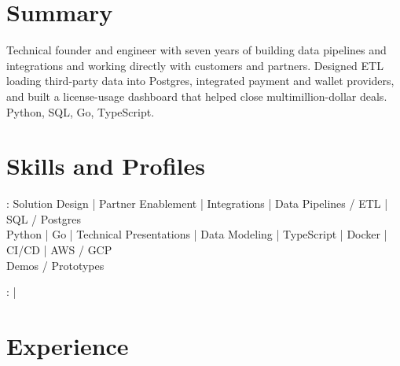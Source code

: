 \documentclass[print]{jack-resume}
\begin{document}
\pagecolor{darkmodeBackground}


\begin{minipage}[t][1cm][t]{.03\textwidth}
    \hfill
\end{minipage}

\section{Summary}
Technical founder and engineer with seven years of building data pipelines and integrations and working directly with customers and partners. Designed ETL loading third-party data into Postgres, integrated payment and wallet providers, and built a license-usage dashboard that helped close multimillion-dollar deals. Python, SQL, Go, TypeScript.
\sectionsep

\section{Skills and Profiles}
:
Solution Design \hfill | \hfill
Partner Enablement \hfill | \hfill
Integrations \hfill | \hfill
Data Pipelines / ETL \hfill | \hfill
SQL / Postgres \\
\hspace{1.0cm} Python \hfill | \hfill
Go \hfill | \hfill
Technical Presentations \hfill | \hfill
Data Modeling \hfill | \hfill
TypeScript \hfill | \hfill
Docker \hfill | \hfill
CI/CD \hfill | \hfill
AWS / GCP \\
\hspace{1.0cm} Demos / Prototypes \\

\raggedright{
    :
      \href{https://www.linkedin.com/in/jack-sturtevant/}{ \ExternalLink} |
     \href{https://github.com/jacksturt}{ \ExternalLink}}

\section{Experience}
\end{document}
